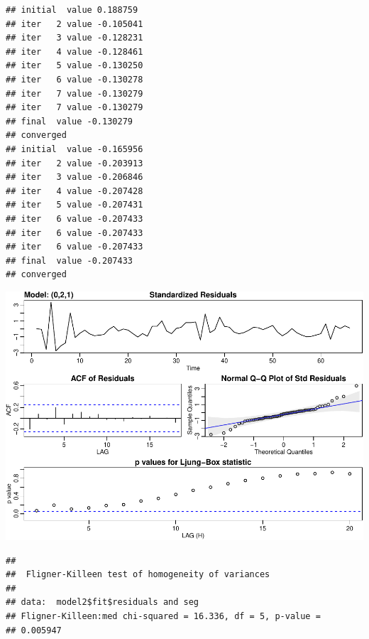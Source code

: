 \documentclass[]{article}
\newenvironment{Shaded}{\begin{snugshade}}{\end{snugshade}}
\newcommand{\DataTypeTok}[1]{\textcolor[rgb]{0.13,0.29,0.53}{#1}}
\newcommand{\DecValTok}[1]{\textcolor[rgb]{0.00,0.00,0.81}{#1}}
\newcommand{\KeywordTok}[1]{\textcolor[rgb]{0.13,0.29,0.53}{\textbf{#1}}}
\newcommand{\NormalTok}[1]{#1}
\newcommand{\OperatorTok}[1]{\textcolor[rgb]{0.81,0.36,0.00}{\textbf{#1}}}
\newcommand{\StringTok}[1]{\textcolor[rgb]{0.31,0.60,0.02}{#1}}
\begin{document}
\begin{verbatim}
## initial  value 0.188759 
## iter   2 value -0.105041
## iter   3 value -0.128231
## iter   4 value -0.128461
## iter   5 value -0.130250
## iter   6 value -0.130278
## iter   7 value -0.130279
## iter   7 value -0.130279
## final  value -0.130279 
## converged
## initial  value -0.165956 
## iter   2 value -0.203913
## iter   3 value -0.206846
## iter   4 value -0.207428
## iter   5 value -0.207431
## iter   6 value -0.207433
## iter   6 value -0.207433
## iter   6 value -0.207433
## final  value -0.207433 
## converged
\end{verbatim}

\begin{center}\includegraphics{Q5_files/figure-latex/unnamed-chunk-11-1} \end{center}

\begin{Shaded}
\end{Shaded}

\begin{verbatim}
## 
##  Fligner-Killeen test of homogeneity of variances
## 
## data:  model2$fit$residuals and seg
## Fligner-Killeen:med chi-squared = 16.336, df = 5, p-value =
## 0.005947
\end{verbatim}
\end{document}
